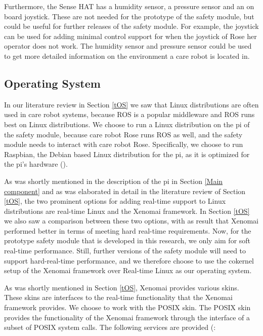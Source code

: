 \documentclass[12pt]{scrreprt}
\begin{document}
Furthermore, the Sense HAT has a humidity sensor, a  pressure sensor and an on board joystick. These are not needed for the prototype of the safety module, but could be useful for further releases of the safety module. For example, the joystick can be used for adding minimal control support for when the joystick of Rose her operator does not work. The humidity sensor and pressure sensor could be used to get more detailed information on the environment a care robot is located in.

\subsection{Operating System}
\label{Operating System}
In our literature review in Section \ref{tOS} we saw that Linux distributions are often used in care robot systems, because ROS is a popular middleware and ROS runs best on Linux distributions. We choose to run a Linux distribution on the \gls{pi} of the safety module, because care robot Rose runs ROS as well, and the safety module needs to interact with care robot Rose. Specifically, we choose to run Raspbian, the Debian based Linux distribution for the \gls{pi}, as it is optimized for the \gls{pi}'s hardware (\cite{raspbian}).
\par
As was shortly mentioned in the description of the \gls{pi} in Section \ref{Main component} and as was elaborated in detail in the literature review of Section \ref{tOS}, the two prominent options for adding real-time support to Linux distributions are real-time Linux and the Xenomai framework. In Section \ref{tOS} we also saw a comparison between these two options, with as result that Xenomai performed better in terms of meeting hard real-time requirements. Now, for the prototype safety module that is developed in this research, we only aim for soft real-time performance. Still, further versions of the safety module will need to support hard-real-time performance, and we therefore choose to use the cokernel setup of the Xenomai framework over Real-time Linux as our operating system.
\par 
As was shortly mentioned in Section \ref{tOS}, Xenomai provides various skins. These skins are interfaces to the real-time functionality that the Xenomai framework provides. We choose to work with the POSIX skin. The POSIX skin provides the functionality of the Xenomai framework through the interface of a subset of POSIX system calls. The following services are provided (\cite{posix_xenomai}:
\end{document}
